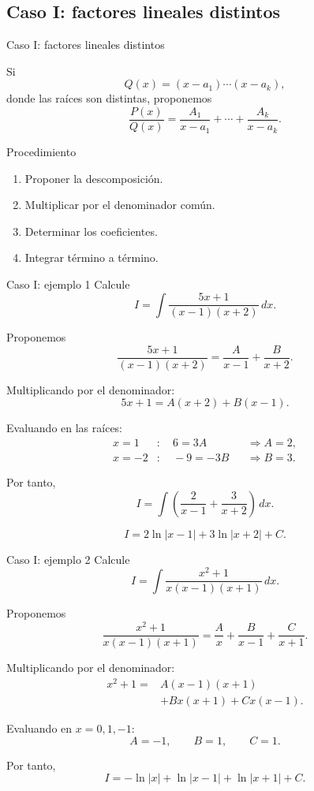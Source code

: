 \documentclass[10pt,aspectratio=169]{beamer}
\begin{document}
\subsection{Caso I: factores lineales distintos}

\begin{frame}{Caso I: factores lineales distintos}
\small

Si
\[
Q(x)=(x-a_1)\cdots(x-a_k),
\]
donde las raíces son distintas, proponemos
\[
\boxed{
\frac{P(x)}{Q(x)}
=
\frac{A_1}{x-a_1}
+\cdots+
\frac{A_k}{x-a_k}.
}
\]

\begin{block}{Procedimiento}
\begin{enumerate}
\item Proponer la descomposición.
\item Multiplicar por el denominador común.
\item Determinar los coeficientes.
\item Integrar término a término.
\end{enumerate}
\end{block}
\end{frame}

\begin{frame}{Caso I: ejemplo 1}
\small
Calcule
\[
I=\int\frac{5x+1}{(x-1)(x+2)}\,dx.
\]

Proponemos
\[
\frac{5x+1}{(x-1)(x+2)}
=
\frac{A}{x-1}+\frac{B}{x+2}.
\]

Multiplicando por el denominador:
\[
5x+1=A(x+2)+B(x-1).
\]

Evaluando en las raíces:
\[
\begin{aligned}
x=1 &: \quad 6=3A
&&\Rightarrow A=2,\\
x=-2 &: \quad -9=-3B
&&\Rightarrow B=3.
\end{aligned}
\]

Por tanto,
\[
I=\int\left(
\frac{2}{x-1}+\frac{3}{x+2}
\right)\,dx.
\]

\[
\boxed{
I=2\ln|x-1|+3\ln|x+2|+C.
}
\]
\end{frame}

\begin{frame}{Caso I: ejemplo 2}
\small
Calcule
\[
I=\int\frac{x^2+1}{x(x-1)(x+1)}\,dx.
\]

Proponemos
\[
\frac{x^2+1}{x(x-1)(x+1)}
=
\frac{A}{x}
+\frac{B}{x-1}
+\frac{C}{x+1}.
\]

Multiplicando por el denominador:
\[
\begin{aligned}
x^2+1={}&A(x-1)(x+1)\\
&+Bx(x+1)+Cx(x-1).
\end{aligned}
\]

Evaluando en $x=0,1,-1$:
\[
A=-1,\qquad B=1,\qquad C=1.
\]

Por tanto,
\[
\boxed{
I=-\ln|x|+\ln|x-1|
+\ln|x+1|+C.
}
\]
\end{frame}
\end{document}
